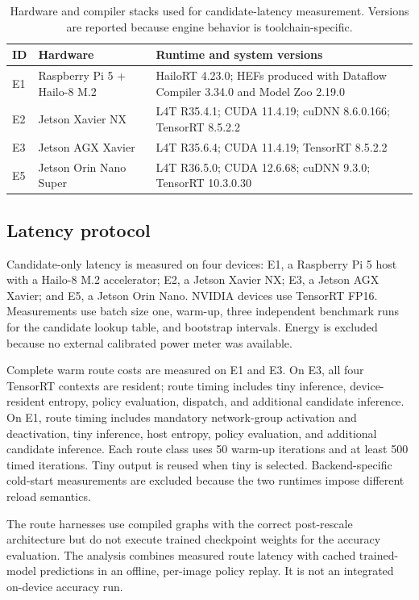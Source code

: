 \documentclass[a4paper,review,12pt]{elsarticle}
\begin{document}
\begin{table}[H]
\centering
\caption{Hardware and compiler stacks used for candidate-latency measurement. Versions are reported because engine behavior is toolchain-specific.}
\label{tab:hardware}
\small
\begin{tabularx}{\textwidth}{@{}llX@{}}
\toprule
ID & Hardware & Runtime and system versions \\
\midrule
E1 & Raspberry Pi 5 + Hailo-8 M.2 & HailoRT 4.23.0; HEFs produced with Dataflow Compiler 3.34.0 and Model Zoo 2.19.0 \\
E2 & Jetson Xavier NX & L4T R35.4.1; CUDA 11.4.19; cuDNN 8.6.0.166; TensorRT 8.5.2.2 \\
E3 & Jetson AGX Xavier & L4T R35.6.4; CUDA 11.4.19; TensorRT 8.5.2.2 \\
E5 & Jetson Orin Nano Super & L4T R36.5.0; CUDA 12.6.68; cuDNN 9.3.0; TensorRT 10.3.0.30 \\
\bottomrule
\end{tabularx}
\end{table}

\subsection{Latency protocol}

Candidate-only latency is measured on four devices: E1, a Raspberry Pi 5 host with a Hailo-8 M.2 accelerator; E2, a Jetson Xavier NX; E3, a Jetson AGX Xavier; and E5, a Jetson Orin Nano. NVIDIA devices use TensorRT FP16. Measurements use batch size one, warm-up, three independent benchmark runs for the candidate lookup table, and bootstrap intervals. Energy is excluded because no external calibrated power meter was available.

Complete warm route costs are measured on E1 and E3. On E3, all four TensorRT contexts are resident; route timing includes tiny inference, device-resident entropy, policy evaluation, dispatch, and additional candidate inference. On E1, route timing includes mandatory network-group activation and deactivation, tiny inference, host entropy, policy evaluation, and additional candidate inference. Each route class uses 50 warm-up iterations and at least 500 timed iterations. Tiny output is reused when tiny is selected. Backend-specific cold-start measurements are excluded because the two runtimes impose different reload semantics.

The route harnesses use compiled graphs with the correct post-rescale architecture but do not execute trained checkpoint weights for the accuracy evaluation. The analysis combines measured route latency with cached trained-model predictions in an offline, per-image policy replay. It is not an integrated on-device accuracy run.
\end{document}
